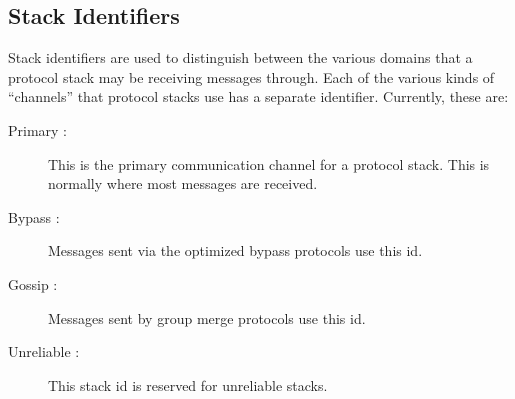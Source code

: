 \subsection{Stack Identifiers}
Stack identifiers are used to distinguish between the various domains that
a protocol stack may be receiving messages through.  Each of the various
kinds of ``channels'' that protocol stacks use has a separate identifier.
Currently, these are:
\begin{description}
\item
[Primary :] This is the primary communication channel for a protocol stack.
This is normally where most messages are received.
\item
[Bypass :] Messages sent via the optimized bypass protocols use this id. 
\item
[Gossip :] Messages sent by group merge protocols use this id.
\item
[Unreliable :] This stack id is reserved for unreliable stacks.
\end{description}
